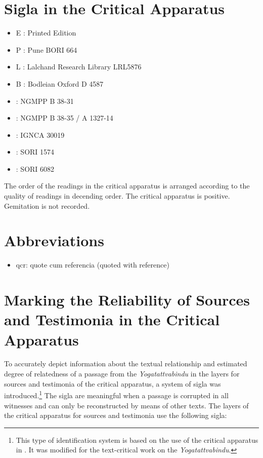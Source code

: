 \section{Sigla in the Critical Apparatus}

\begin{itemize}
\item E : Printed Edition
\item P : Pune BORI 664
\item L : Lalchand Research Library LRL5876
\item B : Bodleian Oxford D 4587
\item \None : NGMPP B 38-31
\item \Ntwo : NGMPP B 38-35 / A 1327-14
\item \Done : IGNCA 30019
\item \Uone : SORI 1574
\item \Utwo: SORI 6082
\end{itemize}

The order of the readings in the critical apparatus is arranged according to the quality of readings in decending order. The critical apparatus is positive. Gemitation is not recorded. 

\section{Abbreviations}
\begin{itemize}
  \item qcr: quote cum referencia (quoted with reference)
  \end{itemize}

\section{Marking the Reliability of Sources and Testimonia in the Critical Apparatus}
\label{kennz}

To accurately depict information about the textual relationship and estimated degree of relatedness of a passage from the \textit{Yogatattvabindu} in the layers for sources and testimonia of the critical apparatus, a system of sigla was introduced.\footnote{This type of identification system is based on the use of the critical apparatus in \parencite[lii-liii]{steinkellner2005}. It was modified for the text-critical work on the \textit{Yogatattvabindu}.} The sigla are meaningful when a passage is corrupted in all witnesses and can only be reconstructed by means of other texts. The layers of the critical apparatus for sources and testimonia use the following sigla:

